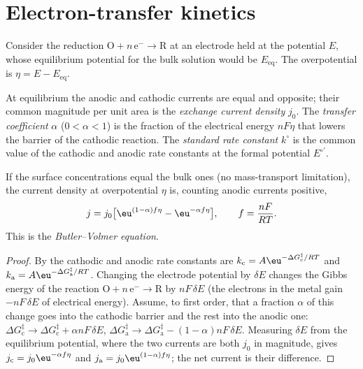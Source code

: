 \section{Electron-transfer kinetics}

Consider the reduction $\mathrm{O} + n\,\mathrm{e}^- \to \mathrm{R}$ at an electrode held at the potential $E$,
whose equilibrium potential for the bulk solution would be $E_{\mathrm{eq}}$. The
overpotential is $\eta = E - E_{\mathrm{eq}}$.

\begin{definition}\label{def:b3:electrode-kinetics:exchange}
At equilibrium the anodic and cathodic currents are equal and opposite; their
common magnitude per unit area is the \emph{exchange current
density} $j_0$. The \emph{transfer coefficient}
 $\alpha$ ($0 < \alpha < 1$) is the fraction of the
electrical energy $nF\eta$ that lowers the barrier of the cathodic reaction. The
\emph{standard rate constant} $k^\circ$ is the common
value of the cathodic and anodic rate constants at the formal potential $E^{\circ\prime}$.
\end{definition}

\begin{theorem}\label{thm:b3:electrode-kinetics:butler-volmer}
If the surface concentrations equal the bulk ones (no mass-transport
limitation), the current density at overpotential $\eta$ is, counting anodic
currents positive,
\[
  j = j_0\bigl[\eu^{(1 - \alpha)f\eta} - \eu^{-\alpha f\eta}\bigr], \qquad f = \frac{nF}{RT}.
\]
This is the \emph{Butler--Volmer equation}.
\end{theorem}

\begin{proof}
By  the cathodic and anodic rate constants are
$k_{\mathrm c} = A\eu^{-\Delta G_{\mathrm c}^{\ddagger}/RT}$ and $k_{\mathrm a} = A\eu^{-\Delta G_{\mathrm a}^{\ddagger}/RT}$. Changing the electrode potential by $\delta E$
changes the Gibbs energy of the reaction $\mathrm{O} + n\,\mathrm{e}^- \to \mathrm{R}$ by $nF\,\delta E$ (the electrons
in the metal gain $-nF\,\delta E$ of electrical energy). Assume, to first order, that a
fraction $\alpha$ of this change goes into the cathodic barrier and the rest into the
anodic one: $\Delta G_{\mathrm c}^{\ddagger} \to \Delta G_{\mathrm c}^{\ddagger} + \alpha nF\,\delta E$, $\Delta G_{\mathrm a}^{\ddagger} \to \Delta G_{\mathrm a}^{\ddagger} - (1 - \alpha)nF\,\delta E$. Measuring $\delta E$
from the equilibrium potential, where the two currents are both $j_0$ in
magnitude, gives $j_{\mathrm c} = j_0\eu^{-\alpha f\eta}$ and $j_{\mathrm a} = j_0\eu^{(1 - \alpha)f\eta}$; the net current is their
difference.
\end{proof}

